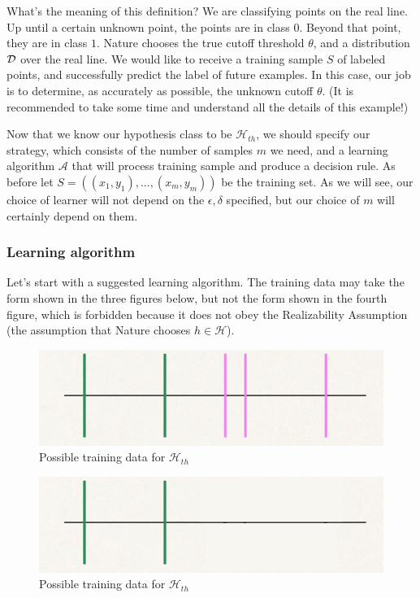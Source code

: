 \documentclass[11pt]{article}
\newcommand{\Ac}{\mathcal{A}}
\newcommand{\Hc}{\mathcal{H}}
\begin{document}
What's the meaning of this definition? We are classifying points on the real line. Up until a certain unknown point, the points are in class $0$. Beyond that point, they are in class $1$. Nature chooses the true cutoff threshold $\theta$, and a distribution $\mathcal{D}$ over the real line.  We would like to receive a training sample $S$ of labeled points, and successfully predict the label of future examples. In this case, our job is to determine, as accurately as possible, the unknown cutoff $\theta$. (It is recommended to take some time and understand all the details of this example!) 

Now that we know our hypothesis class to be $\Hc_{th}$, we should specify our strategy, which consists of the number of samples $m$ we need, and a learning algorithm $\Ac$ that will process training sample and produce a decision rule. As before let $S=((x_1,y_1),...,(x_m,y_m))$ be the training set. As we will see, our choice of learner will not depend on the $\epsilon, \delta$ specified, but our choice of $m$ will certainly depend on them.

\subsubsection*{Learning algorithm}

Let's start with a suggested learning algorithm.
The training data may take the form shown in the three figures below, but not
the form shown in the fourth figure, which is forbidden because it does not obey
the Realizability Assumption (the assumption that Nature chooses $h\in\Hc$).

\begin{figure}[h!]
\centering
\includegraphics[scale=0.3]{thresholds1.png}
\caption{Possible training data for $\Hc_{th}$}
\end{figure}

\begin{figure}[h!]
\centering
\includegraphics[scale=0.3]{thresholds1a.png}
\caption{Possible training data for $\Hc_{th}$}
\end{figure}
\end{document}
